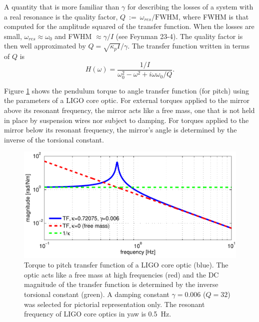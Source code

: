 A quantity that is more familiar than $\gamma$ for describing the
losses of a system with a real resonance is the quality factor,
$Q~:=~\omega_{res}/\mathrm{FWHM}$, where FWHM is that computed for the
amplitude squared of the transfer function. When the losses are small,
$\omega_{res} \approx \omega_0$ and FWHM $\approx \gamma/I$ (see
Feynman 23-4). The quality factor is then well approximated by $Q =
\sqrt{\kappa_p I}/\gamma$. The transfer function written in terms of
$Q$ is
\begin{equation}
H(\omega) = \frac{1/I}{\omega_0^2  - \omega^2 + i \omega \omega_0 / Q}.
\label{eq:TFpendulum}
\end{equation}

Figure \ref{fig:pendTF} shows the pendulum torque to angle transfer
function (for pitch) using the parameters of a LIGO core optic. For
external torques applied to the mirror above its resonant frequency,
the mirror acts like a free mass, one that is not held in place by
suspension wires nor subject to damping. For torques applied to the
mirror below its resonant frequency, the mirror's angle is determined
by the inverse of the torsional constant.

\begin{figure}
\begin{centering}
\includegraphics[width=1.0\textwidth]{figures/pendTF.pdf}
\caption{Torque to pitch transfer function of a LIGO core optic
  (blue). The optic acts like a free mass at high frequencies (red)
  and the DC magnitude of the transfer function is determined by the
  inverse torsional constant (green). A damping constant $\gamma =
  0.006$ ($Q=32$) was selected for pictorial representation only. The
  resonant frequency of LIGO core optics in yaw is 0.5~Hz.}
\label{fig:pendTF}
\end{centering}
\end{figure}





